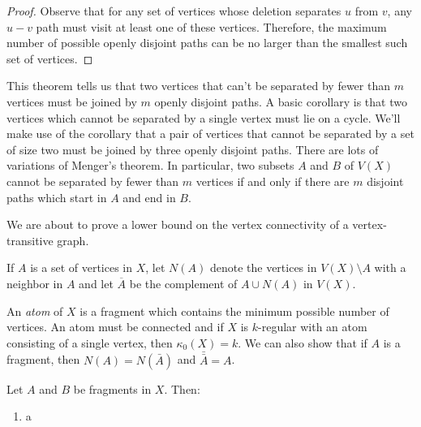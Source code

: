 \begin{proof}
	Observe that for any set of vertices whose deletion separates $u$ from $v$, any $u{-}v$ path must visit at least one of these vertices.  Therefore, the maximum number of possible openly disjoint paths can be no larger than the smallest such set of vertices.
\end{proof}

This theorem tells us that two vertices that can't be separated by fewer than $m$ vertices must be joined by $m$ openly disjoint paths.  A basic corollary is that two vertices which cannot be separated by a single vertex must lie on a cycle.  We'll make use of the corollary that a pair of vertices that cannot be separated by a set of size two must be joined by three openly disjoint paths.  There are lots of variations of Menger's theorem.  In particular, two subsets $A$ and $B$ of $V(X)$ cannot be separated by fewer than $m$ vertices if and only if there are $m$ disjoint paths which start in $A$ and end in $B$.

We are about to prove a lower bound on the vertex connectivity of a vertex-transitive graph.

If $A$ is a set of vertices in $X$, let $N(A)$ denote the vertices in $V(X)\setminus A$ with a neighbor in $A$ and let $\overline{A}$ be the complement of $A\cup N(A)$ in $V(X)$.


An \textit{atom} of $X$ is a fragment which contains the minimum possible number of vertices.  An atom must be connected and if $X$ is $k$-regular with an atom consisting of a single vertex, then $\kappa_0(X)=k$.  We can also show that if $A$ is a fragment, then $N(A)=N(\bar{A})$ and $\bar{\bar{A}}=A$.
 
 \begin{lemma}
Let $A$ and $B$ be fragments in $X$.  Then:
\begin{enumerate}
	\item a
\end{enumerate}
 \end{lemma}
 
 




\ifdraft


\fi